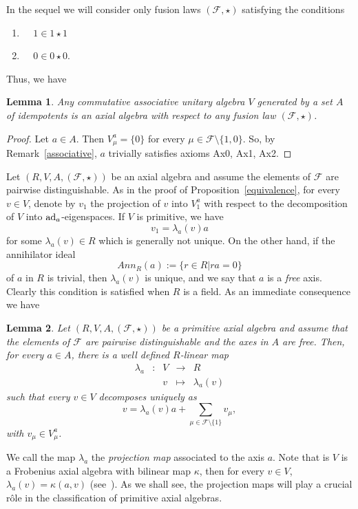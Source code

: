 \documentclass[a4paper]{amsart}
\newtheorem{lemma}{Lemma}[section]
\newcommand{\ad}{{\rm ad}}
\begin{document}
In the sequel we will consider only fusion laws $(\mathcal F, \star)$ satisfying the conditions
\begin{enumerate}
\item [F1] $\:\:\:\:\:1\in 1\star 1$ 
\item [F2] $\:\:\:\:\:0\in 0\star 0$.
\end{enumerate}

Thus, we have

\begin{lemma}\label{any}
Any commutative associative unitary algebra $V$ generated by a set $A$ of idempotents is an axial algebra with respect to any fusion law $(\mathcal F, \star)$.
\end{lemma}
\begin{proof}
Let $a\in A$. Then $V_\mu^a=\{0\}$ for every $\mu\in \mathcal F\setminus \{1,0\}$. So, by Remark~\ref{associative}, $a$ trivially satisfies axioms Ax0, Ax1, Ax2. 
\end{proof}


Let $(R,V, A, (\mathcal F, \star))$ be an axial algebra and 
 assume the elements of $\mathcal F$ are pairwise distinguishable. As in the proof of  Proposition~\ref{equivalence}, for every $v\in V$, denote by $v_1$ the projection of $v$ into $V_1^a$ with respect to the decomposition of $V$ into $\ad_a$-eigenspaces. If $V$ is primitive, we have 
 $$v_1=\lambda_a(v)a$$ 
 for some $\lambda_a(v) \in R$ which is generally not unique. On the other hand, if  the annihilator ideal $$Ann_R(a):=\{r\in R| ra=0\}$$ 
of $a$ in $R$ is trivial, then $\lambda_a(v)$ is unique, and we say that $a$ is a {\it free} axis. Clearly this condition is satisfied when $R$ is a field. 
As an immediate consequence we have  

\begin{lemma}\label{lambdafunction}
Let $(R,V, A, (\mathcal F, \star))$ be a primitive axial algebra and assume that the elements of $\mathcal F$ are pairwise distinguishable and the axes in $A$ are free. Then, for every $a\in A$, there is a well defined $R$-linear map 
\begin{equation}
\label{lambda}
\begin{array}{rcccc}
\lambda_a & \colon & V& \to & R\\
&& v &\mapsto & \lambda_a(v)
\end{array}
\end{equation}
such that every $v\in V$ decomposes uniquely as
\begin{equation}\label{justapply}
v=\lambda_a(v)a+\sum_{\mu\in \mathcal F\setminus \{1\}}v_\mu, 
\end{equation}
with $v_\mu\in V_\mu^a$.
\end{lemma}
We call the map $\lambda_a$ the {\em projection map}  associated to the axis $a$. Note that is $V$ is a Frobenius axial algebra with bilinear map $\kappa$, then for every $v\in V$, $\lambda_a(v)=\kappa(a,v)$ (see~\cite{HRS}). As we shall see, the projection maps will play a crucial r\^ole in the classification of primitive axial algebras.
\end{document}
